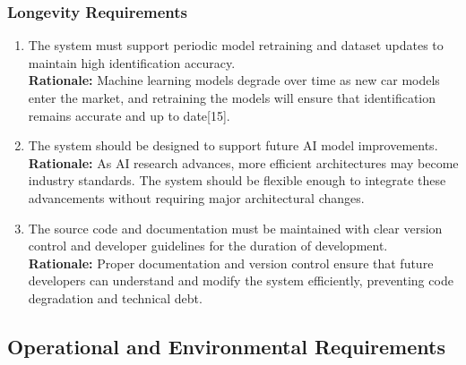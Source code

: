 \documentclass[]{article}
\begin{document}
\subsubsection{Longevity Requirements}
\label{ssub:longevity_requirements}
\begin{enumerate}[label={PR-L\arabic*.}]
    \item The system must support periodic model retraining and dataset updates to maintain high identification accuracy.\\
	\textbf{Rationale:} Machine learning models degrade over time as new car models enter the market, and retraining the models will ensure that identification remains accurate and up to date[15].
	\item The system should be designed to support future AI model improvements.\\
	\textbf{Rationale:} As AI research advances, more efficient architectures may become industry standards. The system should be flexible enough to integrate these advancements without requiring major architectural changes.
	\item The source code and documentation must be maintained with clear version control and developer guidelines for the duration of development.\\
	\textbf{Rationale:} Proper documentation and version control ensure that future developers can understand and modify the system efficiently, preventing code degradation and technical debt.

\end{enumerate}


\subsection{Operational and Environmental Requirements}
\label{sub:operational_and_environmental_requirements}
\end{document}
